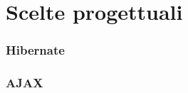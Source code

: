 \documentclass[a4paper,10pt]{article}
\begin{document}
\part{Scelte progettuali}

\section{Hibernate}

\section{AJAX}
\end{document}
